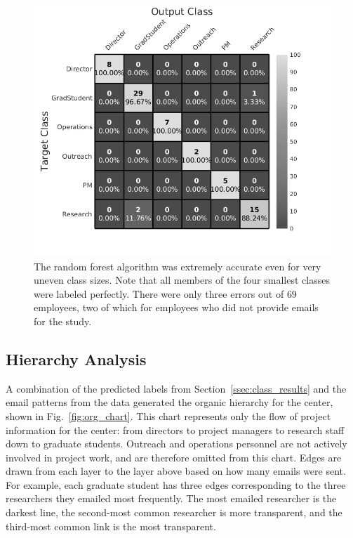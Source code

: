 \documentclass[10pt,twocolumn,conference]{IEEEtran}
\begin{document}
\begin{figure}[t]
    \centering
    \includegraphics[width=0.85\columnwidth,trim={1mm 8mm 10mm 0mm},clip]{Classification_confusion_BW}
    \vspace{-15pt}
    \caption{The random forest algorithm was extremely accurate even for very uneven class sizes.  Note that all members of the four smallest classes were labeled perfectly.  There were only three errors out of $69$ employees, two of which for employees who did not provide emails for the study.}
    \vspace{-12pt}
    \label{fig:result_hist}
\end{figure}


\subsection{Hierarchy Analysis}
A combination of the predicted labels from Section~\ref{ssec:class_results} and the email patterns from the data generated the organic hierarchy for the center, shown in Fig.~\ref{fig:org_chart}.
This chart represents only the flow of project information for the center: from directors to project managers to research staff down to graduate students.
Outreach and operations personnel are not actively involved in project work, and are therefore omitted from this chart.
Edges are drawn from each layer to the layer above based on how many emails were sent.
For example, each graduate student has three edges corresponding to the three researchers they emailed most frequently.
The most emailed researcher is the darkest line, the second-most common researcher is more transparent, and the third-most common link is the most transparent.
\end{document}
